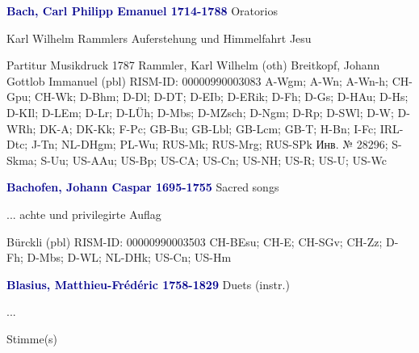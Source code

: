 \documentclass[twocolumn]{book}
\begin{document}
\newline \par \vspace{7pt} \textcolor{darkblue}{\textbf{Bach, Carl Philipp Emanuel  1714-1788}}
\newline Oratorios
\newline \begin{itshape}Karl Wilhelm Rammlers Auferstehung und Himmelfahrt Jesu\end{itshape} 
\newline \textcolor{darkblue}{}  Partitur
\newline Musikdruck  1787
\newline Rammler, Karl Wilhelm  (oth)
\newline Breitkopf, Johann Gottlob Immanuel  (pbl)
\newline RISM-ID: 00000990003083
\newline A-Wgm; A-Wn; A-Wn-h; CH-Gpu; CH-Wk; D-Bhm; D-Dl; D-DT; D-EIb; D-ERik; D-Fh; D-Gs; D-HAu; D-Hs; D-KIl; D-LEm; D-Lr; D-LÜh; D-Mbs; D-MZsch; D-Ngm; D-Rp; D-SWl; D-W; D-WRh; DK-A; DK-Kk; F-Pc; GB-Bu; GB-Lbl; GB-Lcm; GB-T; H-Bn; I-Fc; IRL-Dtc; J-Tn; NL-DHgm; PL-Wu; RUS-Mk; RUS-Mrg; RUS-SPk  Инв. № 28296; S-Skma; S-Uu; US-AAu; US-Bp; US-CA; US-Cn; US-NH; US-R; US-U; US-Wc
\newline \par \vspace{7pt} \textcolor{darkblue}{\textbf{Bachofen, Johann Caspar  1695-1755}}
\newline Sacred songs
\newline \begin{itshape}... achte und privilegirte Auflag\end{itshape} 
\newline Bürckli  (pbl)
\newline RISM-ID: 00000990003503
\newline CH-BEsu; CH-E; CH-SGv; CH-Zz; D-Fh; D-Mbs; D-WL; NL-DHk; US-Cn; US-Hm
\newline \par \vspace{7pt} \textcolor{darkblue}{\textbf{Blasius, Matthieu-Frédéric  1758-1829}}
\newline Duets (instr.)
\newline \begin{itshape}...\end{itshape} 
\newline \textcolor{darkblue}{}  Stimme(s)
\end{document}
